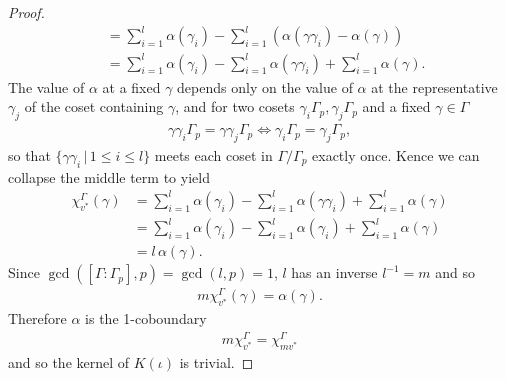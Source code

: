 \begin{proof}
\begin{align*}
	&=  \sum_{i = 1}^l\alpha(\gamma_i) - \sum_{i = 1}^l \left(\alpha(\gamma\gamma_i) - \alpha(\gamma) \right)\\
	&=  \sum_{i = 1}^l\alpha(\gamma_i) - \sum_{i = 1}^l \alpha(\gamma\gamma_i) +\sum_{i = 1}^l \alpha(\gamma).
\end{align*}
The value of $\alpha$ at a fixed $\gamma$ depends only on the value of $\alpha$ at the representative $\gamma_j$ of the coset containing $\gamma$, and for two cosets $\gamma_i \Gamma_p, \gamma_j \Gamma_p$ and a fixed $\gamma \in \Gamma$
\begin{align}
  \gamma \gamma_i \Gamma_p = \gamma \gamma_j \Gamma_p \Leftrightarrow \gamma_i \Gamma_p = \gamma_j \Gamma_p,
\end{align}
so that $\{\gamma \gamma_i \,|\, 1 \leq i \leq l\}$ meets each coset in $\Gamma/\Gamma_p$ exactly once. Kence we can collapse the middle term to yield
\begin{align*}
	\chi_{v^*}^\Gamma(\gamma) 
	&=  \sum_{i = 1}^l\alpha(\gamma_i) - \sum_{i = 1}^l \alpha(\gamma\gamma_i) +\sum_{i = 1}^l \alpha(\gamma)\\
	&=  \sum_{i = 1}^l\alpha(\gamma_i) - \sum_{i = 1}^l \alpha(\gamma_i) +\sum_{i = 1}^l \alpha(\gamma) \\
	&=  l\, \alpha(\gamma).
\end{align*}
Since $\gcd([\Gamma:\Gamma_p], p) = \gcd(l,p) = 1$, $l$ has an inverse $l^{-1} = m$ and so
\begin{align*}
	m\chi_{v^*}^\Gamma(\gamma) = \alpha(\gamma).
\end{align*}
Therefore $\alpha$ is the 1-coboundary
\begin{align}
  m\chi_{v^*}^\Gamma = \chi_{mv^*}^\Gamma
\end{align}
and so the kernel of $K(\iota)$ is trivial.
\end{proof}

